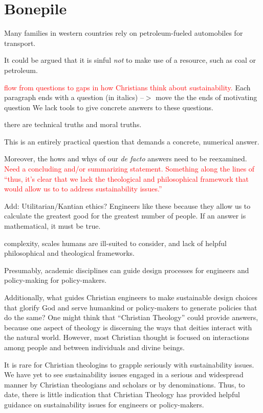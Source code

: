 \documentclass[12pt]{article}
\newcommand{\ins}[1]{\textcolor{red}{#1}}
\begin{document}
\section{Bonepile}


Many families in western countries rely on petroleum-fueled automobiles for transport.

It could be argued that it is sinful \emph{not} to make use of a resource, such as coal or petroleum. 

\ins{flow from questions to gaps in how Christians think about sustainability.}
Each paragraph ends with a question (in italics)
--$>$ move the the ends of motivating question
 We lack tools to give concrete answers to these questions.

there are technical truths and moral truths. 

This is an entirely practical question that demands a concrete, numerical answer.

Moreover, the hows and whys of our \emph{de facto} answers need to be reexamined.
\ins{Need a concluding and/or summarizing statement. Something along the lines of ``thus, it's clear that we lack the theological
and philosophical framework that would allow us to to address sustainability issues.''}

Add: Utilitarian/Kantian ethics? Engineers like these because they allow us to calculate the greatest good for the greatest number of people.
If an answer is mathematical, it must be true.


complexity, scales humans are ill-suited to consider, 
and lack of helpful philosophical and theological frameworks.

Presumably, academic disciplines can guide design processes for engineers
and policy-making for policy-makers.




Additionally, what guides Christian engineers to make sustainable design choices
that glorify God and serve humankind
or policy-makers to generate policies that do the same?
One might think that ``Christian Theology'' could provide answers, because
one aspect of theology is discerning the 
ways that deities interact with the natural world. 
However, most Christian thought is focused on interactions among people 
and between individuals and divine beings.

It is rare for Christian theologins to grapple seriously with 
sustainability issues.
We have yet to see sustainability issues engaged in a serious and widespread manner
by Christian theologians and scholars or by denominations.
Thus, to date, there is little indication that Christian Theology 
has provided helpful guidance on sustainability issues
for engineers or policy-makers.
\end{document}
